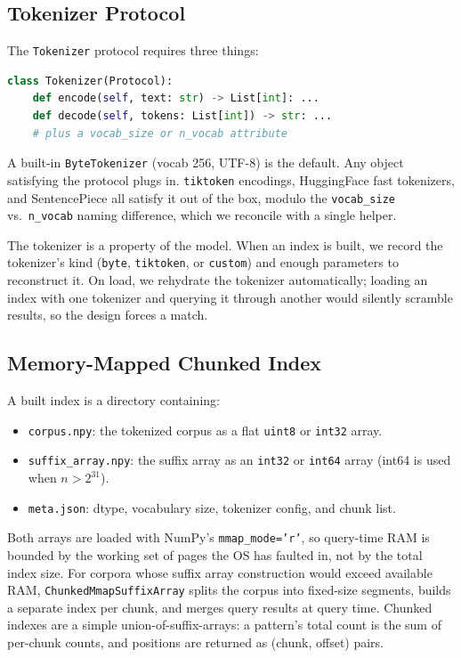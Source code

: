 \documentclass[11pt]{article}
\begin{document}
\subsection{Tokenizer Protocol}

The \texttt{Tokenizer} protocol requires three things:

\begin{lstlisting}[language=Python]
class Tokenizer(Protocol):
    def encode(self, text: str) -> List[int]: ...
    def decode(self, tokens: List[int]) -> str: ...
    # plus a vocab_size or n_vocab attribute
\end{lstlisting}

A built-in \texttt{ByteTokenizer} (vocab 256, UTF-8) is the default. Any object satisfying the protocol plugs in. \texttt{tiktoken} encodings, HuggingFace fast tokenizers, and SentencePiece all satisfy it out of the box, modulo the \texttt{vocab\_size} vs.\ \texttt{n\_vocab} naming difference, which we reconcile with a single helper.

The tokenizer is a property of the model. When an index is built, we record the tokenizer's kind (\texttt{byte}, \texttt{tiktoken}, or \texttt{custom}) and enough parameters to reconstruct it. On load, we rehydrate the tokenizer automatically; loading an index with one tokenizer and querying it through another would silently scramble results, so the design forces a match.

\subsection{Memory-Mapped Chunked Index}

A built index is a directory containing:
\begin{itemize}
    \item \texttt{corpus.npy}: the tokenized corpus as a flat \texttt{uint8} or \texttt{int32} array.
    \item \texttt{suffix\_array.npy}: the suffix array as an \texttt{int32} or \texttt{int64} array (int64 is used when $n > 2^{31}$).
    \item \texttt{meta.json}: dtype, vocabulary size, tokenizer config, and chunk list.
\end{itemize}

Both arrays are loaded with NumPy's \texttt{mmap\_mode='r'}, so query-time RAM is bounded by the working set of pages the OS has faulted in, not by the total index size. For corpora whose suffix array construction would exceed available RAM, \texttt{ChunkedMmapSuffixArray} splits the corpus into fixed-size segments, builds a separate index per chunk, and merges query results at query time. Chunked indexes are a simple union-of-suffix-arrays: a pattern's total count is the sum of per-chunk counts, and positions are returned as (chunk, offset) pairs.
\end{document}
